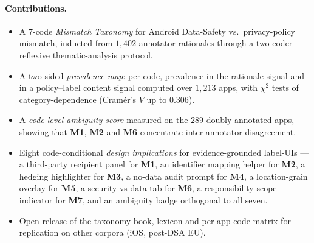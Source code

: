 \documentclass[11pt,a4paper]{article}
\newcommand{\code}[1]{\textsf{\textbf{#1}}}
\begin{document}
\paragraph{Contributions.}
\begin{itemize}[topsep=2pt,itemsep=1pt,leftmargin=1.5em]
\item[\textbf{C1}.] A $7$-code \emph{Mismatch Taxonomy} for Android
Data-Safety vs.\ privacy-policy mismatch, inducted from $1{,}402$
annotator rationales through a two-coder reflexive
thematic-analysis protocol.
\item[\textbf{C2}.] A two-sided \emph{prevalence map}: per code,
prevalence in the rationale signal and in a policy--label content
signal computed over $1{,}213$ apps, with $\chi^2$ tests of
category-dependence (Cram\'er's $V$ up to $0.306$).
\item[\textbf{C3}.] A \emph{code-level ambiguity score} measured on the
$289$ doubly-annotated apps, showing that \code{M1}, \code{M2} and
\code{M6} concentrate inter-annotator disagreement.
\item[\textbf{C4}.] Eight code-conditional \emph{design implications}
for evidence-grounded label-UIs --- a third-party recipient panel for
\code{M1}, an identifier mapping helper for \code{M2}, a hedging
highlighter for \code{M3}, a no-data audit prompt for \code{M4}, a
location-grain overlay for \code{M5}, a security-vs-data tab for
\code{M6}, a responsibility-scope indicator for \code{M7}, and an
ambiguity badge orthogonal to all seven.
\item[\textbf{C5}.] Open release of the taxonomy book, lexicon and
per-app code matrix for replication on other corpora (iOS,
post-DSA EU).
\end{itemize}
\end{document}
